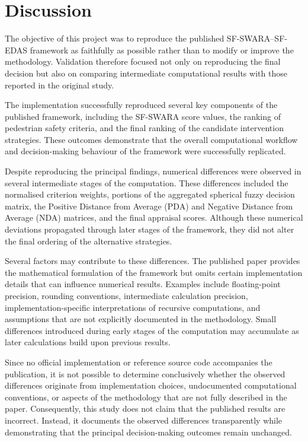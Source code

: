 \documentclass[11pt]{article}
\begin{document}
\section{Discussion}
The objective of this project was to reproduce the published SF-SWARA--SF-EDAS framework as faithfully as possible rather than to modify or improve the methodology. Validation therefore focused not only on reproducing the final decision but also on comparing intermediate computational results with those reported in the original study.

The implementation successfully reproduced several key components of the published framework, including the SF-SWARA score values, the ranking of pedestrian safety criteria, and the final ranking of the candidate intervention strategies. These outcomes demonstrate that the overall computational workflow and decision-making behaviour of the framework were successfully replicated.

Despite reproducing the principal findings, numerical differences were observed in several intermediate stages of the computation. These differences included the normalised criterion weights, portions of the aggregated spherical fuzzy decision matrix, the Positive Distance from Average (PDA) and Negative Distance from Average (NDA) matrices, and the final appraisal scores. Although these numerical deviations propagated through later stages of the framework, they did not alter the final ordering of the alternative strategies.

Several factors may contribute to these differences. The published paper provides the mathematical formulation of the framework but omits certain implementation details that can influence numerical results. Examples include floating-point precision, rounding conventions, intermediate calculation precision, implementation-specific interpretations of recursive computations, and assumptions that are not explicitly documented in the methodology. Small differences introduced during early stages of the computation may accumulate as later calculations build upon previous results.

Since no official implementation or reference source code accompanies the publication, it is not possible to determine conclusively whether the observed differences originate from implementation choices, undocumented computational conventions, or aspects of the methodology that are not fully described in the paper. Consequently, this study does not claim that the published results are incorrect. Instead, it documents the observed differences transparently while demonstrating that the principal decision-making outcomes remain unchanged.
\end{document}
